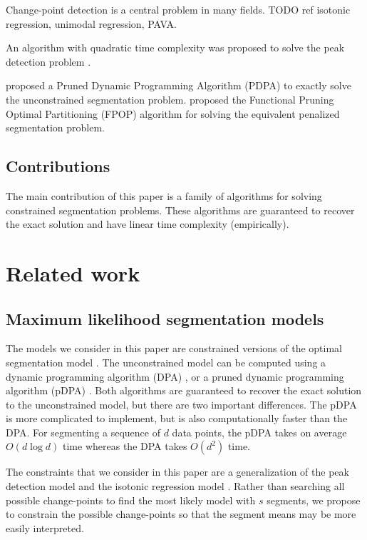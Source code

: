 \documentclass{article}
\begin{document}
Change-point detection is a central problem in many fields. TODO ref
isotonic regression, unimodal regression, PAVA.

An algorithm with quadratic time complexity was proposed to solve the
peak detection problem \citep{PeakSeg}. 

\citet{pruned-dp} proposed a Pruned Dynamic Programming Algorithm
(PDPA) to exactly solve the unconstrained segmentation
problem. \citet{FPOP} proposed the Functional Pruning Optimal
Partitioning (FPOP) algorithm for solving the equivalent penalized
segmentation problem.

\subsection{Contributions}

The main contribution of this paper is a family of algorithms for
solving constrained segmentation problems. These algorithms are
guaranteed to recover the exact solution and have linear time
complexity (empirically).

\section{Related work}
\label{sec:related}

\subsection{Maximum likelihood segmentation models}

The models we consider in this paper are constrained versions of the
optimal segmentation model \citep{TODO_MORE_REFS,Segmentor}. The
unconstrained model can be computed using a dynamic programming
algorithm (DPA) \citep{bellman}, or a pruned dynamic programming
algorithm (pDPA) \citep{pruned-dp}. Both algorithms are guaranteed to
recover the exact solution to the unconstrained model, but there are
two important differences. The pDPA is more complicated to implement,
but is also computationally faster than the DPA. For segmenting a
sequence of $d$ data points, the pDPA takes on average $O(d\log d)$
time whereas the DPA takes $O(d^2)$ time.

The constraints that we consider in this paper are a generalization of
the peak detection model \citep{PeakSeg} and the isotonic regression
model \citep{isotonic}. Rather than searching all possible
change-points to find the most likely model with $s$ segments, we
propose to constrain the possible change-points so that the segment
means may be more easily interpreted.
\end{document}
